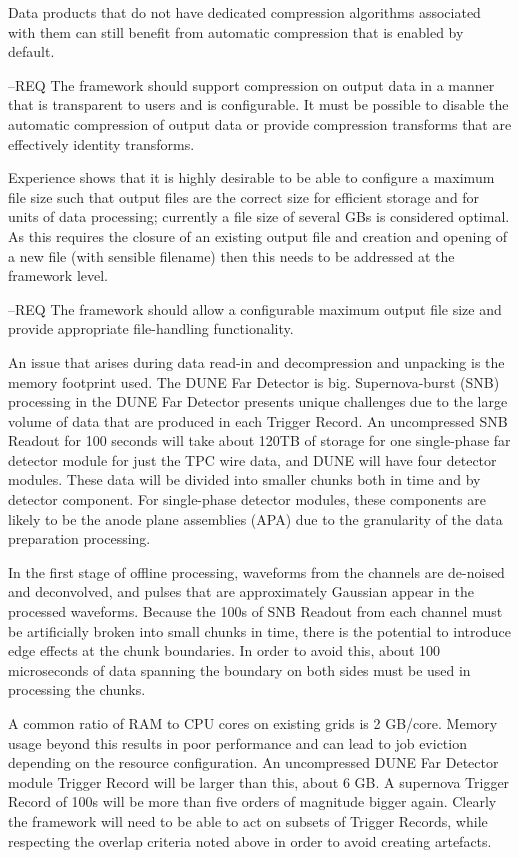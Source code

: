 \documentclass[../main-v1.tex]{subfiles}
\begin{document}
Data products that do not have dedicated compression algorithms associated with them can still benefit from automatic compression that is enabled by default.

--REQ The framework should support compression on output data in a manner that is transparent to users and is configurable.  It must be possible to disable the automatic compression of output data or provide compression transforms that are effectively identity transforms.

Experience shows that it is highly desirable to be able to configure a maximum file size such that output files are the correct size for efficient storage and for units of data processing; currently a file size of several GBs is considered optimal.  As this requires the closure of an existing output file and creation and opening of a new file (with sensible filename) then this needs to be addressed at the framework level.

--REQ The framework should allow a configurable maximum output file size and provide appropriate file-handling functionality.



An issue that arises during data read-in and decompression and unpacking is the memory footprint used.  The DUNE Far Detector is big.  Supernova-burst (SNB) processing in the DUNE Far Detector presents unique challenges due to the large volume of data that are produced in each Trigger Record.  An uncompressed SNB Readout for 100 seconds will take about 120TB of storage for one single-phase far detector module for just the TPC wire data, and DUNE will have four detector modules.  These data will be divided into smaller chunks both in time and by detector component.  For single-phase detector modules, these components are likely to be the anode plane assemblies (APA) due to the granularity of the data preparation processing.

In the first stage of offline processing, waveforms from the channels are de-noised and deconvolved, and pulses that are approximately Gaussian appear in the processed waveforms. Because the 100s of SNB Readout from each channel must be artificially broken into small chunks in time, there is the potential to introduce edge effects at the chunk boundaries. In order to avoid this, about 100 microseconds of data spanning the boundary on both sides must be used in processing the chunks.

A common ratio of RAM to CPU cores on existing grids is 2 GB/core.  Memory usage beyond this results in poor performance and can lead to job eviction depending on the resource configuration.  An uncompressed DUNE Far Detector module Trigger Record will be larger than this, about 6 GB.  A supernova Trigger Record of 100s will be more than five orders of magnitude bigger again.  Clearly the framework will need to be able to act on subsets of Trigger Records, while respecting the overlap criteria noted above in order to avoid creating artefacts.
\end{document}
